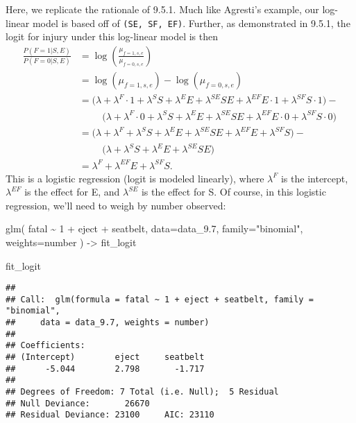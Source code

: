 \documentclass[
]{article}
\newenvironment{Shaded}{\begin{snugshade}}{\end{snugshade}}
\newcommand{\AttributeTok}[1]{\textcolor[rgb]{0.77,0.63,0.00}{#1}}
\newcommand{\DecValTok}[1]{\textcolor[rgb]{0.00,0.00,0.81}{#1}}
\newcommand{\FloatTok}[1]{\textcolor[rgb]{0.00,0.00,0.81}{#1}}
\newcommand{\FunctionTok}[1]{\textcolor[rgb]{0.00,0.00,0.00}{#1}}
\newcommand{\NormalTok}[1]{#1}
\newcommand{\OtherTok}[1]{\textcolor[rgb]{0.56,0.35,0.01}{#1}}
\newcommand{\SpecialCharTok}[1]{\textcolor[rgb]{0.00,0.00,0.00}{#1}}
\newcommand{\StringTok}[1]{\textcolor[rgb]{0.31,0.60,0.02}{#1}}
\begin{document}
Here, we replicate the rationale of 9.5.1. Much like Agresti's example,
our log-linear model is based off of \texttt{(SE,\ SF,\ EF)}. Further,
as demonstrated in 9.5.1, the logit for injury under this log-linear
model is then \begin{align*}
\frac{
P(F=1|S, E)
}{
P(F=0|S, E)
}
&= 
\log\left(
\frac{\mu_{f=1, s, e}}{\mu_{f=0, s, e}}
\right)\\
&=
\log(\mu_{f=1, s, e}) - \log(\mu_{f=0, s, e})\\
&=
\bigg(\lambda + \lambda^F\cdot 1 + \lambda^SS + \lambda^EE + \lambda^{SE}SE + \lambda^{EF}E\cdot 1 + \lambda^{SF}S\cdot 1\bigg) - 
\\
&\hspace{1cm}
\bigg(
\lambda + \lambda^F\cdot 0 + \lambda^SS + \lambda^EE + \lambda^{SE}SE + \lambda^{EF}E\cdot 0 + \lambda^{SF}S\cdot 0 \bigg)\\
&=
\bigg(\lambda + \lambda^F + \lambda^SS + \lambda^EE + \lambda^{SE}SE + \lambda^{EF}E + \lambda^{SF}S\bigg) - \\
&\hspace{1cm}\bigg(\lambda + \lambda^SS + \lambda^EE + \lambda^{SE}SE\bigg) \\
&=
\lambda^F + \lambda^{EF}E + \lambda^{SF}S.
\end{align*} This is a logistic regression (logit is modeled linearly),
where \(\lambda^F\) is the intercept, \(\lambda^{EF}\) is the effect for
E, and \(\lambda^{SE}\) is the effect for S. Of course, in this logistic
regression, we'll need to weigh by number observed:

\begin{Shaded}
\begin{Highlighting}[]
\FunctionTok{glm}\NormalTok{(}
\NormalTok{  fatal }\SpecialCharTok{\textasciitilde{}} \DecValTok{1} \SpecialCharTok{+}\NormalTok{ eject }\SpecialCharTok{+}\NormalTok{ seatbelt,}
  \AttributeTok{data=}\NormalTok{data\_9}\FloatTok{.7}\NormalTok{,}
  \AttributeTok{family=}\StringTok{"binomial"}\NormalTok{,}
  \AttributeTok{weights=}\NormalTok{number}
\NormalTok{) }\OtherTok{{-}\textgreater{}}\NormalTok{ fit\_logit}

\NormalTok{fit\_logit}
\end{Highlighting}
\end{Shaded}

\begin{verbatim}
## 
## Call:  glm(formula = fatal ~ 1 + eject + seatbelt, family = "binomial", 
##     data = data_9.7, weights = number)
## 
## Coefficients:
## (Intercept)        eject     seatbelt  
##      -5.044        2.798       -1.717  
## 
## Degrees of Freedom: 7 Total (i.e. Null);  5 Residual
## Null Deviance:       26670 
## Residual Deviance: 23100     AIC: 23110
\end{verbatim}
\end{document}
